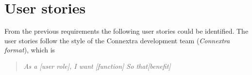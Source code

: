 \chapter{User stories}

From the previous requirements the following user stories could be identified. The user stories follow the style of the Connextra development team (\textit{Connextra format}), which is %
\begin{quote}
\textit{As a [user role], \newline I want [function] \newline So that[benefit]}
\end{quote}

